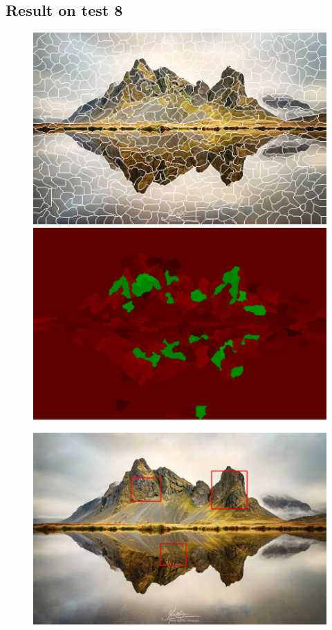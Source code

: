 \documentclass[a4paper,titlepaget]{article}
\begin{document}
\subsection{Result on test 8}
\begin{figure}[htpb] 
	\centering
	\begin{minipage}{.3\textwidth}
		\includegraphics[width=1.7\textwidth]{images/results/8seg} 
	\end{minipage}
	\hspace{.25\textwidth}
	\begin{minipage}{.3\textwidth}
		\includegraphics[width=1.7\textwidth]{images/results/8map}
	\end{minipage}  
\end{figure}
\begin{figure}[htpb]
	\centering
	\includegraphics[width=.9\textwidth]{images/results/8fin}
\end{figure}
\end{document}
